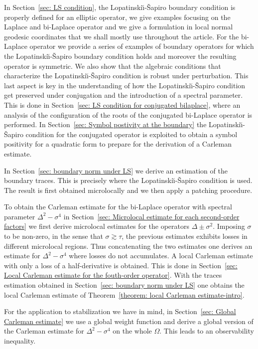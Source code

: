 \documentclass[10pt]{amsart}
\theoremstyle{plain}
\theoremstyle{definition}
\newcommand{\LS}{Lopatinski\u{\i}-\v{S}apiro\xspace}
\begin{document}
In Section~\ref{sec: LS condition}, the \LS boundary condition is
properly defined for an elliptic operator, we give examples focusing
on the Laplace and bi-Laplace operator and we give a formulation in
local normal geodesic coordinates that we shall mostly use throughout
the article. For the bi-Laplace operator we provide a series of
examples of boundary operators for which the \LS boundary condition
holds and moreover the resulting operator is symmetric. We also show
that the algebraic conditions that characterize the \LS condition is
robust under perturbation. This last aspect is key in the
understanding of how the \LS condition get preserved under conjugation
and the introduction of a spectral parameter. This is done in
Section~\ref{sec: LS condition for conjugated bilaplace}, where an
analysis of the configuration of the roots of the conjugated
bi-Laplace operator is performed. In Section~\ref{sec: Symbol postivity at the boundary} the \LS condition for the conjugated
operator is exploited to obtain a symbol positivity for a quadratic
form to prepare for the derivation of a Carleman estimate.

In Section~\ref{sec: boundary norm under LS} we derive an estimation of
the boundary traces. This is precisely where the \LS condition is
used. The result is first obtained microlocally and we then apply a
patching procedure.

To obtain the Carleman estimate for the bi-Laplace operator with
spectral parameter $\Delta^2 - \sigma^4$ in Section~\ref{sec: Microlocal estimate for each second-order factors} we first
derive microlocal estimates for the operators $\Delta \pm \sigma^2$.
Imposing $\sigma$ to be non-zero, in the sense that $\sigma \gtrsim
\tau$, the previous estimates exhibits losses in different microlocal
regions. Thus concatenating the two estimates one derives an estimate
for $\Delta^2 - \sigma^4$ where losses do not accumulates. A local Carleman
estimate with only a loss of a half-derivative is obtained. This is
done in Section~\ref{sec: Local Carleman estimate for the fouth-order operator}. With the traces estimation obtained in Section~\ref{sec:
boundary norm under LS} one obtains the local Carleman estimate of
Theorem~\ref{theorem: local Carleman estimate-intro}.

For the application to stabilization we have in mind, in
Section~\ref{sec: Global Carleman estimate} we use a global weight
function and derive a global version of the Carleman estimate for
$\Delta^2 - \sigma^4$ on the whole $\Omega$.
This leads to an observability inequality.
\end{document}
